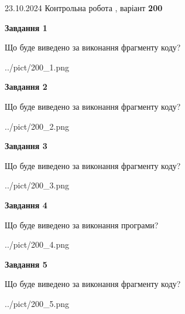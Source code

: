 \documentclass[12pt, ukrainian]{article}
\begin{document}
{\Large{23.10.2024 Контрольна робота , варіант  \No \textbf { 200 }\par}}
{
\begin {large}
{\begin {center}\textbf{Завдання 1}\end {center}}

Що буде виведено за виконання фрагменту коду?\par
\begin{center}
	{../pict/200_1.png}
\end{center}
\newpage

{\begin {center}\textbf{Завдання 2}\end {center}}

Що буде виведено за виконання фрагменту коду?\par
\begin{center}
	{../pict/200_2.png}
\end{center}
\newpage

{\begin {center}\textbf{Завдання 3}\end {center}}

Що буде виведено за виконання фрагменту коду?\par
\begin{center}
	{../pict/200_3.png}
\end{center}
\newpage

{\begin {center}\textbf{Завдання 4}\end {center}}

Що буде виведено за виконання програми?\par
\begin{center}
	{../pict/200_4.png}
\end{center}
\newpage

{\begin {center}\textbf{Завдання 5}\end {center}}

Що буде виведено за виконання фрагменту коду?\par
\begin{center}
	{../pict/200_5.png}
\end{center}
\newpage


\end{large}}
\end{document}
